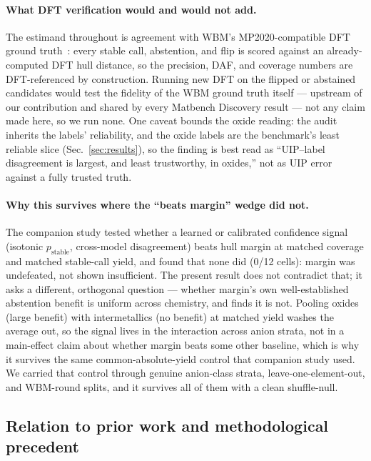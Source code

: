 \documentclass[aip,jcp,preprint,superscriptaddress,amsmath,amssymb]{revtex4-2}
\begin{document}
\paragraph{What DFT verification would and would not add.} The estimand throughout is
agreement with WBM's MP2020-compatible DFT ground truth~\citep{wang2021mp2020,riebesell2025}:
every stable call, abstention, and flip is scored against an already-computed DFT hull
distance, so the precision, DAF, and coverage numbers are DFT-referenced by construction.
Running new DFT on the flipped or abstained candidates would test the fidelity of the WBM
ground truth itself --- upstream of our contribution and shared by every Matbench Discovery
result --- not any claim made here, so we run none. One caveat bounds the oxide reading: the
audit inherits the labels' reliability, and the oxide labels are the benchmark's least
reliable slice (Sec.~\ref{sec:results}), so the finding is best read as ``UIP--label disagreement is
largest, and least trustworthy, in oxides,'' not as UIP error against a fully trusted truth.

\paragraph{Why this survives where the ``beats margin'' wedge did not.} The companion study
tested whether a learned or calibrated confidence signal (isotonic $p_{\mathrm{stable}}$,
cross-model disagreement) beats hull margin at matched coverage and matched stable-call
yield, and found that none did (0/12 cells): margin was undefeated, not shown insufficient. The
present result does not contradict that; it asks a different, orthogonal question --- whether
margin's own well-established abstention benefit is uniform across chemistry, and finds it is
not. Pooling oxides (large benefit) with intermetallics (no benefit) at matched yield washes
the average out, so the signal lives in the interaction across anion strata, not in a
main-effect claim about whether margin beats some other baseline, which is why it survives
the same common-absolute-yield control that companion study used. We carried that control
through genuine anion-class strata, leave-one-element-out, and WBM-round splits, and it survives
all of them with a clean shuffle-null.

\subsection{Relation to prior work and methodological precedent}
\end{document}
